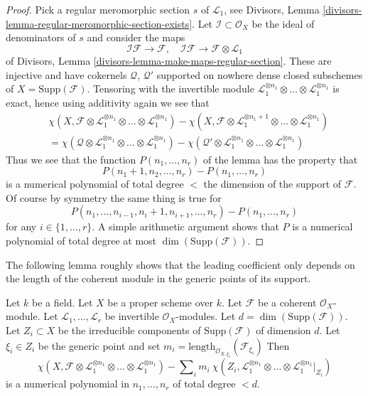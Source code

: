 \begin{proof}
\medskip\noindent
Pick a regular meromorphic section $s$ of $\mathcal{L}_1$, see
Divisors, Lemma \ref{divisors-lemma-regular-meromorphic-section-exists}.
Let $\mathcal{I} \subset \mathcal{O}_X$ be the ideal of
denominators of $s$ and consider the maps
$$
\mathcal{I}\mathcal{F} \to \mathcal{F},\quad
\mathcal{I}\mathcal{F} \to \mathcal{F} \otimes \mathcal{L}_1
$$
of Divisors, Lemma \ref{divisors-lemma-make-maps-regular-section}.
These are injective and have cokernels $\mathcal{Q}$, $\mathcal{Q}'$
supported on nowhere dense closed subschemes of $X = \text{Supp}(\mathcal{F})$.
Tensoring with the invertible module
$\mathcal{L}_1^{\otimes n_1} \otimes \ldots \otimes \mathcal{L}_1^{\otimes n_1}$
is exact, hence using additivity again
we see that
\begin{align*}
&\chi(X, \mathcal{F} \otimes \mathcal{L}_1^{\otimes n_1} \otimes \ldots \otimes
\mathcal{L}_1^{\otimes n_1}) -
\chi(X, \mathcal{F} \otimes \mathcal{L}_1^{\otimes n_1 + 1}
\otimes \ldots \otimes \mathcal{L}_1^{\otimes n_1}) \\
& =
\chi(\mathcal{Q} \otimes \mathcal{L}_1^{\otimes n_1} \otimes \ldots \otimes
\mathcal{L}_1^{\otimes n_1}) -
\chi(\mathcal{Q}' \otimes \mathcal{L}_1^{\otimes n_1} \otimes \ldots \otimes
\mathcal{L}_1^{\otimes n_1})
\end{align*}
Thus we see that the function $P(n_1, \ldots, n_r)$ of the lemma has
the property that
$$
P(n_1 + 1, n_2, \ldots, n_r) - P(n_1, \ldots, n_r)
$$
is a numerical polynomial of total degree $<$ the dimension
of the support of $\mathcal{F}$. Of course by symmetry the same
thing is true for
$$
P(n_1, \ldots, n_{i - 1}, n_i + 1, n_{i + 1}, \ldots, n_r)
- P(n_1, \ldots, n_r)
$$
for any $i \in \{1, \ldots, r\}$. A simple arithmetic argument shows
that $P$ is a numerical polynomial of total degree at most
$\dim(\text{Supp}(\mathcal{F}))$.
\end{proof}

\noindent
The following lemma roughly shows that the leading coefficient only depends
on the length of the coherent module in the generic points of its
support.

\begin{lemma}
\label{lemma-numerical-polynomial-leading-term}
Let $k$ be a field. Let $X$ be a proper scheme over $k$. Let
$\mathcal{F}$ be a coherent $\mathcal{O}_X$-module. Let
$\mathcal{L}_1, \ldots, \mathcal{L}_r$ be invertible $\mathcal{O}_X$-modules.
Let $d = \dim(\text{Supp}(\mathcal{F}))$.
Let $Z_i \subset X$ be the irreducible components
of $\text{Supp}(\mathcal{F})$ of dimension $d$. Let $\xi_i \in Z_i$
be the generic point and set
$m_i = \text{length}_{\mathcal{O}_{X, \xi_i}}(\mathcal{F}_{\xi_i})$
Then
$$
\chi(X, \mathcal{F} \otimes \mathcal{L}_1^{\otimes n_1} \otimes \ldots \otimes
\mathcal{L}_1^{\otimes n_1}) -
\sum\nolimits_i
m_i\ \chi(Z_i, \mathcal{L}_1^{\otimes n_1} \otimes \ldots \otimes
\mathcal{L}_1^{\otimes n_1}|_{Z_i})
$$
is a numerical polynomial in $n_1, \ldots, n_r$ of total degree $< d$.
\end{lemma}

